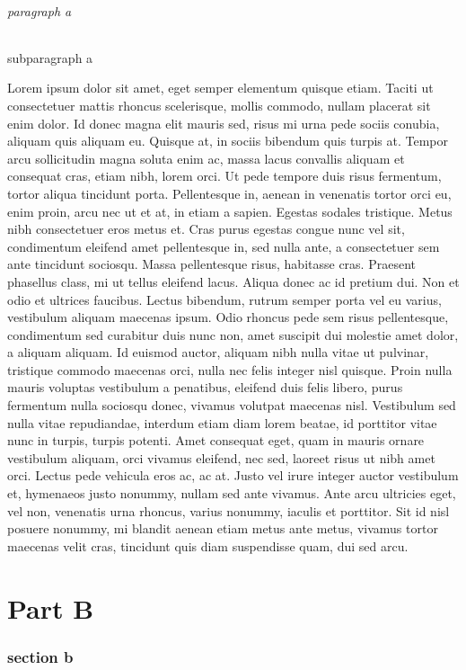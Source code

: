 \documentclass[12pt,a4paper,german]{article}
\begin{document}
\paragraph{paragraph a}
\subparagraph{subparagraph a}
Lorem ipsum dolor sit amet, eget semper elementum quisque etiam. Taciti ut consectetuer mattis rhoncus scelerisque, mollis commodo, nullam placerat sit enim dolor. Id donec magna elit mauris sed, risus mi urna pede sociis conubia, aliquam quis aliquam eu. Quisque at, in sociis bibendum quis turpis at. Tempor arcu sollicitudin magna soluta enim ac, massa lacus convallis aliquam et consequat cras, etiam nibh, lorem orci. Ut pede tempore duis risus fermentum, tortor aliqua tincidunt porta. Pellentesque in, aenean in venenatis tortor orci eu, enim proin, arcu nec ut et at, in etiam a sapien.
Egestas sodales tristique. Metus nibh consectetuer eros metus et. Cras purus egestas congue nunc vel sit, condimentum eleifend amet pellentesque in, sed nulla ante, a consectetuer sem ante tincidunt sociosqu. Massa pellentesque risus, habitasse cras. Praesent phasellus class, mi ut tellus eleifend lacus. Aliqua donec ac id pretium dui.
Non et odio et ultrices faucibus. Lectus bibendum, rutrum semper porta vel eu varius, vestibulum aliquam maecenas ipsum. Odio rhoncus pede sem risus pellentesque, condimentum sed curabitur duis nunc non, amet suscipit dui molestie amet dolor, a aliquam aliquam. Id euismod auctor, aliquam nibh nulla vitae ut pulvinar, tristique commodo maecenas orci, nulla nec felis integer nisl quisque. Proin nulla mauris voluptas vestibulum a penatibus, eleifend duis felis libero, purus fermentum nulla sociosqu donec, vivamus volutpat maecenas nisl. Vestibulum sed nulla vitae repudiandae, interdum etiam diam lorem beatae, id porttitor vitae nunc in turpis, turpis potenti. Amet consequat eget, quam in mauris ornare vestibulum aliquam, orci vivamus eleifend, nec sed, laoreet risus ut nibh amet orci. Lectus pede vehicula eros ac, ac at. Justo vel irure integer auctor vestibulum et, hymenaeos justo nonummy, nullam sed ante vivamus. Ante arcu ultricies eget, vel non, venenatis urna rhoncus, varius nonummy, iaculis et porttitor. Sit id nisl posuere nonummy, mi blandit aenean etiam metus ante metus, vivamus tortor maecenas velit cras, tincidunt quis diam suspendisse quam, dui sed arcu.

\part{Part B}
\section{section b}
\end{document}

